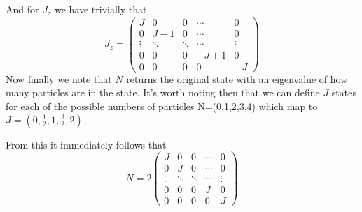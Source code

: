 \documentclass[11pt]{article} %
\begin{document}
And for $J_z$ we have trivially that\\

\begin{equation}
J_z=\begin{pmatrix} J & 0 & 0 & \cdots & 0 \\
0 & J-1  & 0 & \cdots & 0 \\
\vdots & \ddots  & \ddots  & \cdots & \vdots\\
0 & 0 & 0 & -J+1 & 0\\
0 & 0 & 0 & 0& -J 
 \end{pmatrix}
\end{equation}
Now finally we note that $N$ returns the original state with an eigenvalue of how many particles are in the state. It's worth noting then that we can define $J$ states for each of the possible numbers of particles N=(0,1,2,3,4) which map to $J=(0,\frac{1}{2},1,\frac{3}{2},2)$

  From this it immediately follows that\\

\begin{equation}
N=2\begin{pmatrix} 
J & 0 & 0 & \cdots & 0 \\
0 & J  & 0 & \cdots & 0 \\
\vdots & \ddots  & \ddots  & \cdots & \vdots\\
0 & 0 & 0 & J & 0\\
0 & 0 & 0 & 0& J \end{pmatrix}
\end{equation}
\end{document}
